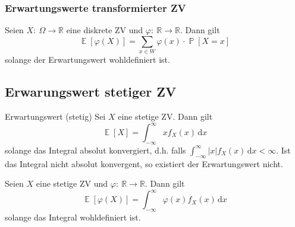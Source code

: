 \documentclass[a4paper,10pt]{article}
\def\R{\mathbb{R}}
\renewcommand{\P}{\operatorname{\mathbb{P}}}
\DeclareMathOperator{\E}{\mathbb{E}}
\DeclareMathOperator{\Ber}{Ber}
\DeclareMathOperator{\Bin}{Bin}
\DeclareMathOperator{\Poisson}{Poisson}
\DeclareMathOperator{\uniform}{\mathcal{U}}
\numberwithin{equation}{section}
\begin{document}



\subsubsection{Erwartungswerte transformierter ZV}

\begin{mainbox}{}
    Seien \( X: \: \Omega \to \R \) eine diskrete ZV und \( \varphi: \: \R \to \R \). Dann gilt
    \[
        \E[\varphi(X)] = \sum_{x \in W} \varphi(x) \cdot \P[X = x]
    \]
    solange der Erwartungswert wohldefiniert ist.
\end{mainbox}

\subsection{Erwarungswert stetiger ZV}

\begin{mainbox}{Erwartungswert (stetig)}
    Sei \( X \) eine stetige ZV. Dann gilt
    \[
        \E[X] = \int_{-\infty}^\infty x f_X(x) \, \mathrm{d}x
    \]
    solange das Integral absolut konvergiert, d.h. falls \( \int_{-\infty}^\infty |x| f_X(x) \, \mathrm{d}x < \infty \). Ist das Integral nicht absolut konvergent, so existiert der Erwartungswert nicht.
\end{mainbox}

\begin{mainbox}{}
    Seien \( X \) eine stetige ZV und \( \varphi: \: \R \to \R \). Dann gilt
    \[
        \E[\varphi(X)] = \int_{-\infty}^\infty \varphi(x) f_X(x) \, \mathrm{d}x
    \]
    solange das Integral wohldefiniert ist.
\end{mainbox}

\end{document}
